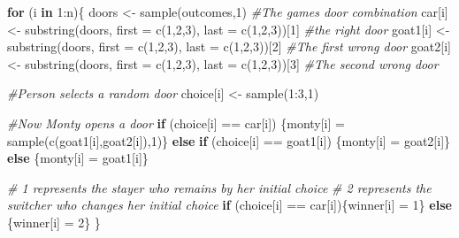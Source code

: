 \documentclass[
]{book}
\newenvironment{Shaded}{\begin{snugshade}}{\end{snugshade}}
\newcommand{\AttributeTok}[1]{\textcolor[rgb]{0.77,0.63,0.00}{#1}}
\newcommand{\CommentTok}[1]{\textcolor[rgb]{0.56,0.35,0.01}{\textit{#1}}}
\newcommand{\ControlFlowTok}[1]{\textcolor[rgb]{0.13,0.29,0.53}{\textbf{#1}}}
\newcommand{\DecValTok}[1]{\textcolor[rgb]{0.00,0.00,0.81}{#1}}
\newcommand{\FunctionTok}[1]{\textcolor[rgb]{0.00,0.00,0.00}{#1}}
\newcommand{\NormalTok}[1]{#1}
\newcommand{\OtherTok}[1]{\textcolor[rgb]{0.56,0.35,0.01}{#1}}
\newcommand{\SpecialCharTok}[1]{\textcolor[rgb]{0.00,0.00,0.00}{#1}}
\begin{document}
\begin{Shaded}
\begin{Highlighting}[]
\ControlFlowTok{for}\NormalTok{ (i }\ControlFlowTok{in} \DecValTok{1}\SpecialCharTok{:}\NormalTok{n)\{}
\NormalTok{  doors }\OtherTok{\textless{}{-}} \FunctionTok{sample}\NormalTok{(outcomes,}\DecValTok{1}\NormalTok{) }\CommentTok{\#The game\textquotesingle{}s door combination}
\NormalTok{  car[i] }\OtherTok{\textless{}{-}} \FunctionTok{substring}\NormalTok{(doors, }\AttributeTok{first =} \FunctionTok{c}\NormalTok{(}\DecValTok{1}\NormalTok{,}\DecValTok{2}\NormalTok{,}\DecValTok{3}\NormalTok{), }\AttributeTok{last =} \FunctionTok{c}\NormalTok{(}\DecValTok{1}\NormalTok{,}\DecValTok{2}\NormalTok{,}\DecValTok{3}\NormalTok{))[}\DecValTok{1}\NormalTok{] }\CommentTok{\#the right door}
\NormalTok{  goat1[i] }\OtherTok{\textless{}{-}} \FunctionTok{substring}\NormalTok{(doors, }\AttributeTok{first =} \FunctionTok{c}\NormalTok{(}\DecValTok{1}\NormalTok{,}\DecValTok{2}\NormalTok{,}\DecValTok{3}\NormalTok{), }\AttributeTok{last =} \FunctionTok{c}\NormalTok{(}\DecValTok{1}\NormalTok{,}\DecValTok{2}\NormalTok{,}\DecValTok{3}\NormalTok{))[}\DecValTok{2}\NormalTok{] }\CommentTok{\#The first wrong door}
\NormalTok{  goat2[i] }\OtherTok{\textless{}{-}} \FunctionTok{substring}\NormalTok{(doors, }\AttributeTok{first =} \FunctionTok{c}\NormalTok{(}\DecValTok{1}\NormalTok{,}\DecValTok{2}\NormalTok{,}\DecValTok{3}\NormalTok{), }\AttributeTok{last =} \FunctionTok{c}\NormalTok{(}\DecValTok{1}\NormalTok{,}\DecValTok{2}\NormalTok{,}\DecValTok{3}\NormalTok{))[}\DecValTok{3}\NormalTok{] }\CommentTok{\#The second wrong door}
  
  \CommentTok{\#Person selects a random door}
\NormalTok{  choice[i] }\OtherTok{\textless{}{-}} \FunctionTok{sample}\NormalTok{(}\DecValTok{1}\SpecialCharTok{:}\DecValTok{3}\NormalTok{,}\DecValTok{1}\NormalTok{)}
  
  \CommentTok{\#Now Monty opens a door}
  \ControlFlowTok{if}\NormalTok{ (choice[i] }\SpecialCharTok{==}\NormalTok{ car[i])}
\NormalTok{    \{monty[i] }\OtherTok{=} \FunctionTok{sample}\NormalTok{(}\FunctionTok{c}\NormalTok{(goat1[i],goat2[i]),}\DecValTok{1}\NormalTok{)\}}
  \ControlFlowTok{else} \ControlFlowTok{if}\NormalTok{ (choice[i] }\SpecialCharTok{==}\NormalTok{ goat1[i])}
\NormalTok{    \{monty[i] }\OtherTok{=}\NormalTok{ goat2[i]\}}
  \ControlFlowTok{else}
\NormalTok{    \{monty[i] }\OtherTok{=}\NormalTok{ goat1[i]\}}

  \CommentTok{\# 1 represents the stayer who remains by her initial choice}
  \CommentTok{\# 2 represents the switcher who changes her initial choice}
  \ControlFlowTok{if}\NormalTok{ (choice[i] }\SpecialCharTok{==}\NormalTok{ car[i])\{winner[i] }\OtherTok{=} \DecValTok{1}\NormalTok{\} }\ControlFlowTok{else}\NormalTok{ \{winner[i] }\OtherTok{=} \DecValTok{2}\NormalTok{\}}
\NormalTok{\}}
\end{Highlighting}
\end{Shaded}
\end{document}
